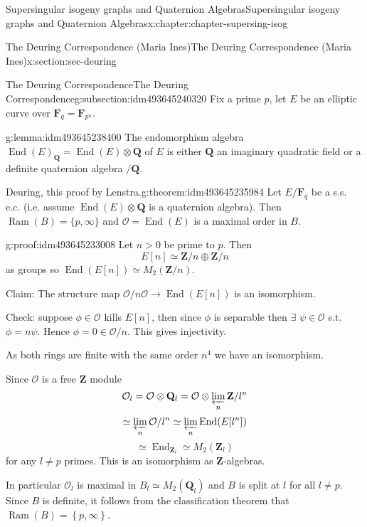 \documentclass[oneside,10pt,]{book}
\numberwithin{equation}{section}
\newcommand{\lb}{[}
\newcommand{\rb}{]}
\newcommand{\ZZ}{\mathbf{Z}}
\newcommand{\QQ}{\mathbf{Q}}
\newcommand{\FF}{\mathbf{F}}
\newcommand{\ints}{\mathcal{O}}
\DeclareMathOperator{\End}{End}
\newcommand{\gt}{>}
\begin{document}
\begin{chapterptx}{Supersingular isogeny graphs and Quaternion Algebras}{}{Supersingular isogeny graphs and Quaternion Algebras}{}{}{x:chapter:chapter-supersing-isog}
\begin{sectionptx}{The Deuring Correspondence (Maria Ines)}{}{The Deuring Correspondence (Maria Ines)}{}{}{x:section:sec-deuring}
\typeout{************************************************}
%
\begin{subsectionptx}{The Deuring Correspondence}{}{The Deuring Correspondence}{}{}{g:subsection:idm493645240320}
Fix a prime \(p\), let \(E\) be an elliptic curve over \(\FF_q = \FF_{p^n}\).%
\begin{lemma}{}{}{g:lemma:idm493645238400}%
The endomorphism algebra  \(\End(E)_\QQ = \End(E) \otimes \QQ\) of \(E\) is either \(\QQ\) an imaginary quadratic field or a definite quaternion algebra \(/\QQ\).%
\end{lemma}
\begin{theorem}{Deuring, this proof by Lenstra.}{}{g:theorem:idm493645235984}%
Let \(E/\FF_q\) be a s.s. e.c. (i.e. assume \(\End(E) \otimes \QQ\) is a quaternion algebra). Then \(\operatorname{Ram}(B)  =    \{p, \infty\}\) and \(\ints = \End(E) \) is a maximal order in \(B\).%
\end{theorem}
\begin{proofptx}{}{g:proof:idm493645233008}
Let \(n \gt 0\)  be prime to \(p \). Then%
\begin{equation*}
E \lb n \rb  \simeq \ZZ/ n \oplus \ZZ/n
\end{equation*}
as groups so \(\End(E\lb n\rb ) \simeq M_2(\ZZ/n)\).%
\par
Claim: The structure map \(\ints/n\ints  \to \End(E\lb n \rb)\) is an isomorphism.%
\par
Check: suppose \(\phi \in  \ints\) kills \(E\lb n \rb\), then since \(\phi\) is separable then \(\exists\) \(\psi \in \ints\) s.t. \(\phi = n \psi\). Hence \(\phi = 0 \in \ints/n\). This gives injectivity.%
\par
As both rings are finite with the same order \(n^4\) we have an isomorphism.%
\par
Since \(\ints\) is a free \(\ZZ\) module%
\begin{equation*}
\ints_l = \ints \otimes \QQ_l = \ints \otimes \varprojlim _n \ZZ/l^n
\end{equation*}
%
\begin{equation*}
\simeq \varprojlim_n \ints/l^n \simeq \varprojlim_n \End(E[l^n])
\end{equation*}
%
\begin{equation*}
\simeq \End_{\ZZ_l}  \simeq M_2( \ZZ_l)
\end{equation*}
for any \(l \ne p\) primes. This is an isomorphism as \(\ZZ\)-algebras.%
\par
In particular \(\ints_l\) is maximal in \(B_l \simeq M_2(\QQ_l)\) and \(B\) is split at \(l\) for all \(l\ne p\). Since \(B\) is definite, it follows from the classification theorem that \(\operatorname{Ram}(B)  = \left\{ p, \infty \right\}\).%

\end{proofptx}
\end{subsectionptx}
\end{sectionptx}
\end{chapterptx}
\end{document}
